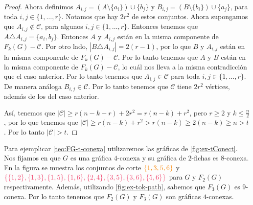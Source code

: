 \begin{proof}
Ahora definimos $A_{i,j} = (A\setminus \{a_i\}) \cup \{b_j\}$ y $B_{i,j} =
(B\setminus \{b_i\}) \cup \{a_j\}$, para toda $ i, j \in \{1, \dots, r\}$.
Notamos que hay $2r^2$ de estos conjuntos. Ahora supongamos que $A_{i,j} \notin
\mathcal{C}$, para algunos $ i, j \in \{1, \dots, r\}$. Entonces tenemos que $A
\triangle A_{i,j} = \{a_i, b_j\}$. Entonces $A$ y $A_{i,j}$ est\'an en la misma
componente de $F_k(G)- \mathcal{C}$. Por otro lado, $|B \triangle A_{i,j}| = 2
(r-1)$, por lo que $B$ y $A_{i,j}$ est\'an en la misma componente de $F_k(G) -
\mathcal{C}$. Por lo tanto tenemos que $A$ y $B$ est\'an en la misma componente
de $F_k(G)-\mathcal{C}$, lo cu\'al nos lleva a la misma contradicci\'on que el
caso anterior. Por lo tanto tenemos que $A_{i,j} \in \mathcal{C}$ para toda $i,
j \in \{1, \dots, r\}$. De manera an\'aloga $B_{i,j} \in \mathcal{C}$. Por lo
tanto tenemos que $\mathcal{C}$ tiene $2r^2$ v\'ertices, adem\'as de los del
caso anterior.

As\'i, tenemos que $|\mathcal{C}|\geq r(n-k-r)+2r^2 = r(n-k) + r^2$, pero $r
\geq 2$ y $k \leq \frac{n}{2}$, por lo que tenemos que $|\mathcal{C}| \geq
r(n-k)+r^2 > r(n-k) \geq 2(n-k) \geq n >t$. Por lo tanto $|\mathcal{C}|>t$.
\end{proof} 


Para ejemplicar \cref{teo:FG-t-conexa} utilizaremos las gr\'aficas de
\cref{fig:ex-tConect}. Nos fijamos en que $G$ es una gr\'afica $4$-conexa y su
gr\'afica de $2$-fichas es $8$-conexa. En la figura se muestra los conjuntos
de corte ${\color{naranja}\{1,3,5,6\}}$ y
${\color{fushia}\{\{1,2\},\{1,3\},\{1,5\},\{1,6\},\{2,4\},\{3,5\},\{3,6\},\{5,6\}\}}$
para $G$ y $F_2(G)$ respectivamente. Adem\'as, utilizando
\cref{fig:ex-tok-path}, sabemos que $F_3(G)$ es $9$-conexa. Por lo tanto tenemos
que $F_2(G)$ y $F_3(G)$ son gr\'aficas $4$-conexas.


